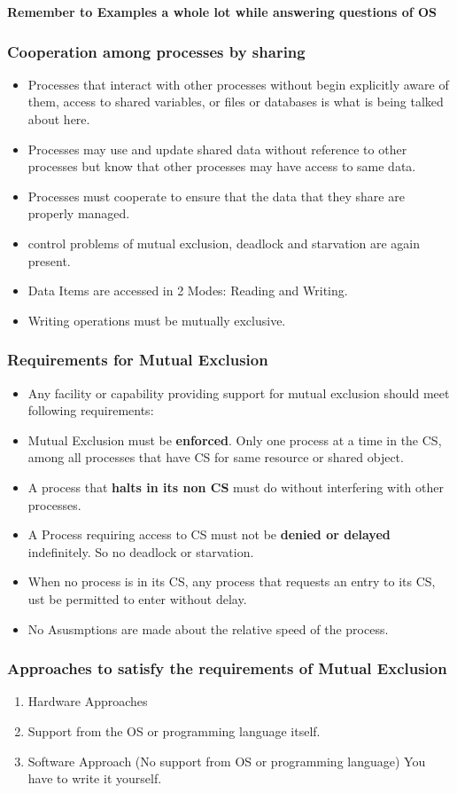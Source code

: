 \documentclass[11pt]{article}
\begin{document}
\textbf{Remember to Examples a whole lot while answering questions of OS}

\subsubsection{Cooperation among processes by sharing}
\begin{itemize}
	\item Processes that interact with other processes without begin explicitly aware of them, access to shared variables, or files or databases is what is being talked about here.
	\item Processes may use and update shared data without reference to other processes but know that other processes may have access to same data.
	\item Processes must cooperate to ensure that the data that they share are properly managed.
	\item control problems of mutual exclusion, deadlock and starvation are again present.
	\item Data Items are accessed in 2 Modes: Reading and Writing.
	\item Writing operations must be mutually exclusive.
\end{itemize}


\subsubsection{Requirements for Mutual Exclusion}
\begin{itemize}
	\item Any facility or capability providing support for mutual exclusion should meet following requirements:
	\item Mutual Exclusion must be \textbf{enforced}. Only one process at a time in the CS, among all processes that have CS for same resource or shared object.
	\item A process that \textbf{halts in its non CS} must do without interfering with other processes.
	\item A Process requiring access to CS must not be \textbf{denied or delayed } indefinitely. So no deadlock or starvation.
	\item When no process is in its CS, any process that requests an entry to its CS, ust be permitted to enter without delay.
	\item No Asusmptions are made about the relative speed of the process.
\end{itemize}

\subsubsection{Approaches to satisfy the requirements of Mutual Exclusion}
\begin{enumerate}
	\item Hardware Approaches
	\item Support from the OS or programming language itself.
	\item Software Approach (No support from OS or programming language) You have to write it yourself.
\end{enumerate}
\end{document}
